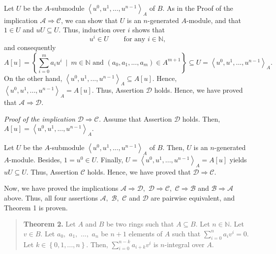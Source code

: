 \documentclass[12pt,final,notitlepage,onecolumn]{article}%
\begin{document}
Let $U$ be the $A$-submodule $\left\langle u^{0},u^{1},...,u^{n-1}%
\right\rangle _{A}$ of $B$. As in the Proof of the implication $\mathcal{A}%
\Longrightarrow\mathcal{C}$, we can show that $U$ is an $n$-generated
$A$-module, and that $1\in U$ and $uU\subseteq U$. Thus, induction over $i$
shows that
\begin{equation}
u^{i}\in U\ \ \ \ \ \ \ \ \ \ \text{for any }i\in\mathbb{N}, \label{2}%
\end{equation}
and consequently%
\[
A\left[  u\right]  =\left\{  \sum\limits_{i=0}^{m}a_{i}u^{i}\ \mid
\ m\in\mathbb{N}\text{ and }\left(  a_{0},a_{1},...,a_{m}\right)  \in
A^{m+1}\right\}  \subseteq U=\left\langle u^{0},u^{1},...,u^{n-1}\right\rangle
_{A}.
\]
On the other hand, $\left\langle u^{0},u^{1},...,u^{n-1}\right\rangle
_{A}\subseteq A\left[  u\right]  $. Hence, $\left\langle u^{0},u^{1}%
,...,u^{n-1}\right\rangle _{A}=A\left[  u\right]  $. Thus, Assertion
$\mathcal{D}$ holds. Hence, we have proved that $\mathcal{A}\Longrightarrow
\mathcal{D}$.

\textit{Proof of the implication }$\mathcal{D}\Longrightarrow\mathcal{C}%
$\textit{.} Assume that Assertion $\mathcal{D}$ holds. Then, $A\left[
u\right]  =\left\langle u^{0},u^{1},...,u^{n-1}\right\rangle _{A}$.

Let $U$ be the $A$-submodule $\left\langle u^{0},u^{1},...,u^{n-1}%
\right\rangle _{A}$ of $B$. Then, $U$ is an $n$-generated $A$-module. Besides,
$1=u^{0}\in U$. Finally, $U=\left\langle u^{0},u^{1},...,u^{n-1}\right\rangle
_{A}=A\left[  u\right]  $ yields $uU\subseteq U$. Thus, Assertion
$\mathcal{C}$ holds. Hence, we have proved that $\mathcal{D}\Longrightarrow
\mathcal{C}$.

Now, we have proved the implications $\mathcal{A}\Longrightarrow\mathcal{D},$
$\mathcal{D}\Longrightarrow\mathcal{C},$ $\mathcal{C}\Longrightarrow
\mathcal{B}$ and $\mathcal{B}\Longrightarrow\mathcal{A}$ above. Thus, all four
assertions $\mathcal{A},$ $\mathcal{B},$ $\mathcal{C}$ and $\mathcal{D}$ are
pairwise equivalent, and Theorem 1 is proven.

\begin{quote}
\textbf{Theorem 2.} Let $A$ and $B$ be two rings such that $A\subseteq B$. Let
$n\in\mathbb{N}$. Let $v\in B$. Let $a_{0},$ $a_{1},$ $...,$ $a_{n}$ be $n+1$
elements of $A$ such that $\sum\limits_{i=0}^{n}a_{i}v^{i}=0$. Let
$k\in\left\{  0,1,...,n\right\}  $. Then, $\sum\limits_{i=0}^{n-k}a_{i+k}%
v^{i}$ is $n$-integral over $A$.
\end{quote}
\end{document}
